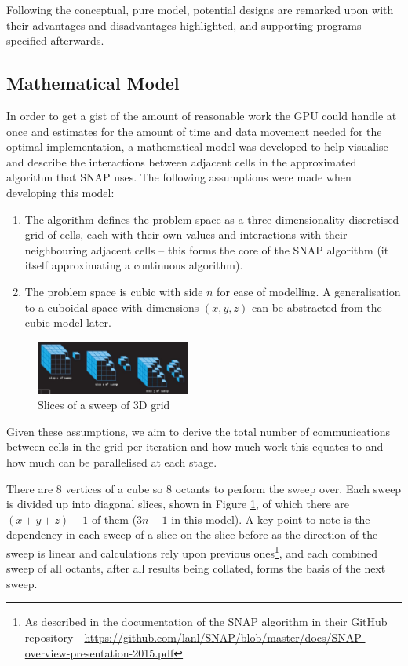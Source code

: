 \documentclass[conference]{IEEEtran}
\begin{document}
Following the conceptual, pure model, potential designs are remarked upon with their advantages and disadvantages highlighted, and supporting programs specified afterwards.


\subsection{Mathematical Model}

In order to get a gist of the amount of reasonable work the GPU could handle at once and estimates for the amount of time and data movement needed for the optimal implementation, a mathematical model was developed to help visualise and describe the interactions between adjacent cells in the approximated algorithm that SNAP uses. The following assumptions were made when developing this model:

\begin{enumerate}

\item The algorithm defines the problem space as a three-dimensionality discretised grid of cells, each with their own values and interactions with their neighbouring adjacent cells – this forms the core of the SNAP algorithm (it itself approximating a continuous algorithm).

\item The problem space is cubic with side $ n $ for ease of modelling. A generalisation to a cuboidal space with dimensions $ (x, y, z) $ can be abstracted from the cubic model later.

\end{enumerate}

\begin{figure}[h!]
\centering
\includegraphics[width=0.45\textwidth]{images/Sweep.jpg}
\caption{Slices of a sweep of 3D grid}
\label{fig:3dsweepslice}
\end{figure}

Given these assumptions, we aim to derive the total number of communications between cells in the grid per iteration and how much work this equates to and how much can be parallelised at each stage.

There are $ 8 $ vertices of a cube so $ 8 $ octants to perform the sweep over. Each sweep is divided up into diagonal slices, shown in Figure \ref{fig:3dsweepslice}, of which there are $ (x + y + z) - 1 $ of them ($ 3n - 1 $ in this model). A key point to note is the dependency in each sweep of a slice on the slice before as the direction of the sweep is linear and calculations rely upon previous ones\footnote{As described in the documentation of the SNAP algorithm in their GitHub repository - \url{ https://github.com/lanl/SNAP/blob/master/docs/SNAP-overview-presentation-2015.pdf}}, and each combined sweep of all octants, after all results being collated, forms the basis of the next sweep.
\end{document}
